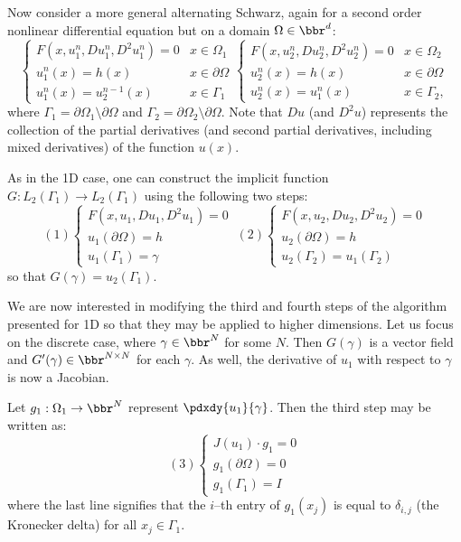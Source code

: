 \documentclass{article}
\begin{document}
Now consider a more general alternating Schwarz, again for a second order nonlinear differential equation but on a domain $\Omega \in \bbr^d$:
\begin{equation*}
\begin{cases} F(x,u_1^n, D u_1^n, D^2 u_1^n) = 0 & x \in \Omega_1 \\
u_1^n(x) = h(x) & x \in \partial \Omega \\
u_1^n(x) = u_2^{n-1}(x) & x \in \Gamma_1 \end{cases}
\begin{cases} F(x,u_2^n, D u_2^n, D^2 u_2^n) = 0 & x \in \Omega_2 \\
u_2^n(x) = h(x) & x \in \partial \Omega \\
u_2^n(x) = u_1^n(x) & x \in \Gamma_2, \end{cases}
\end{equation*}
where $\Gamma_1 = \partial \Omega_1 \setminus \partial \Omega$ and $\Gamma_2 = \partial \Omega_2 \setminus \partial \Omega$.
Note that $Du$ (and $D^2 u$) represents the collection of the partial derivatives (and second partial derivatives, including mixed derivatives) of the function $u(x)$.

As in the 1D case, one can construct the implicit function $G:L_2(\Gamma_1) \to L_2(\Gamma_1)$ using the following two steps:
\begin{equation*}
(1) \begin{cases} F(x,u_1,Du_1,D^2u_1) = 0 \\ u_1(\partial \Omega) = h \\ u_1(\Gamma_1) = \gamma \end{cases} \
(2) \begin{cases} F(x,u_2,Du_2,D^2u_2) = 0 \\ u_2(\partial \Omega) = h \\ u_2(\Gamma_2) = u_1(\Gamma_2) \end{cases}
\end{equation*}
so that $G(\gamma) = u_2(\Gamma_1)$.

We are now interested in modifying the third and fourth steps of the algorithm presented for 1D so that they may be applied to higher dimensions.
Let us focus on the discrete case, where $\gamma \in \bbr^N$ for some $N$.
Then $G(\gamma)$ is a vector field and $G'(\gamma) \in \bbr^{N \times N}$ for each $\gamma$.
As well, the derivative of $u_1$ with respect to $\gamma$ is now a Jacobian.

Let $g_1:\Omega_1 \to \bbr^N$ represent $\pdxdy{u_1}{\gamma}$.
Then the third step may be written as:
\begin{equation*}
(3) \begin{cases} J(u_1) \cdot g_1 = 0 \\
g_1(\partial \Omega) = 0 \\
g_1(\Gamma_1) = I \end{cases}
\end{equation*}
where the last line signifies that the $i$--th entry of $g_1(x_j)$ is equal to $\delta_{i,j}$ (the Kronecker delta) for all $x_j \in \Gamma_1$.
\end{document}
